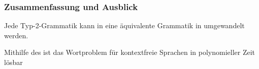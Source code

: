 \documentclass[aspectratio=1610,onlymath]{beamer}
\begin{document}
\begin{frame}\frametitle{Zusammenfassung und Ausblick}

Jede Typ-2-Grammatik kann in eine äquivalente Grammatik in  umgewandelt werden.
\bigskip

Mithilfe des  ist das Wortproblem für kontextfreie Sprachen in polynomieller Zeit lösbar


\end{frame}
\end{document}
